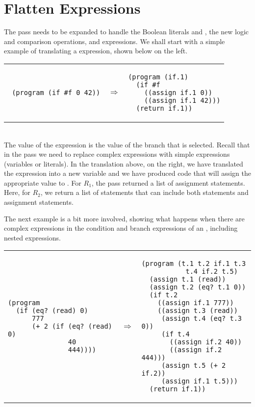 \documentclass[11pt]{book}
\begin{document}
\section{Flatten Expressions}
\label{sec:flatten-r2}

The  pass needs to be expanded to handle the Boolean
literals  and , the new logic and comparison
operations, and  expressions. We shall start with a simple
example of translating a  expression, shown below on the
left. \\
\begin{tabular}{lll}
\begin{minipage}{0.4\textwidth}
\begin{lstlisting}
 (program (if #f 0 42))
\end{lstlisting}
\end{minipage}
&
$\Rightarrow$
&
\begin{minipage}{0.4\textwidth}
\begin{lstlisting}
(program (if.1)
  (if #f
    ((assign if.1 0))
    ((assign if.1 42)))
  (return if.1))
\end{lstlisting}
\end{minipage}
\end{tabular} \\
The value of the  expression is the value of the branch that
is selected. Recall that in the  pass we need to replace
complex expressions with simple expressions (variables or
literals). In the translation above, on the right, we have translated
the  expression into a new variable  and we have
produced code that will assign the appropriate value to .
For $R_1$, the  pass returned a list of assignment
statements. Here, for $R_2$, we return a list of statements that can
include both  statements and assignment statements.

The next example is a bit more involved, showing what happens when
there are complex expressions in the condition and branch expressions
of an , including nested  expressions.

\begin{tabular}{lll}
\begin{minipage}{0.4\textwidth}
\begin{lstlisting}
(program
  (if (eq? (read) 0)
      777
      (+ 2 (if (eq? (read) 0)
               40
               444))))
\end{lstlisting}
\end{minipage}
&
$\Rightarrow$
&
\begin{minipage}{0.4\textwidth}
\begin{lstlisting}
(program (t.1 t.2 if.1 t.3 
           t.4 if.2 t.5)
  (assign t.1 (read))
  (assign t.2 (eq? t.1 0))
  (if t.2
    ((assign if.1 777))
    ((assign t.3 (read))
     (assign t.4 (eq? t.3 0))
     (if t.4
       ((assign if.2 40))
       ((assign if.2 444)))
     (assign t.5 (+ 2 if.2))
     (assign if.1 t.5)))
  (return if.1))
\end{lstlisting}
\end{minipage}
\end{tabular} \\
\end{document}
